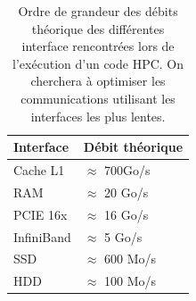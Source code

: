 \begin{table}
\begin{tabular}{ l l }
\hline 
Interface  & Débit théorique \\
\hline 
Cache L1 & $\approx$ 700Go/s \\
RAM & $\approx$ 20 Go/s \\ 
PCIE 16x & $\approx$ 16 Go/s \\
InfiniBand & $\approx$ 5 Go/s \\
SSD & $\approx$ 600 Mo/s \\
HDD & $\approx$ 100 Mo/s
\end{tabular} 
\caption[Débits interfaces]{Ordre de grandeur des débits théorique des différentes interface rencontrées lors de l'exécution d'un code HPC.
On cherchera à optimiser les communications utilisant les interfaces les plus lentes.}
\label{tab:debits}
\end{table}



%

%
%
%
%
%

